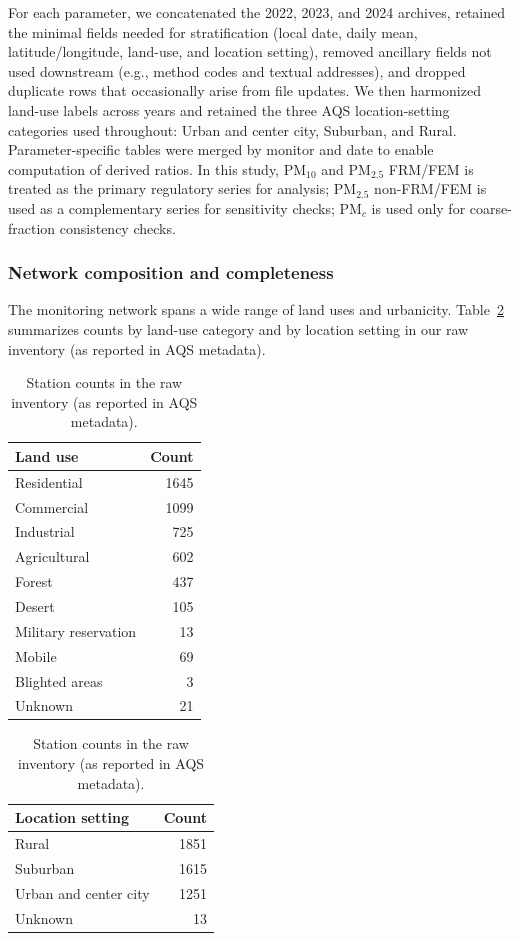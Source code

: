 \documentclass[a4paper,fleqn]{cas-sc}
\begin{document}
For each parameter, we concatenated the 2022, 2023, and 2024 archives, retained the minimal fields needed for stratification (local date, daily mean, latitude/longitude, land-use, and location setting), removed ancillary fields not used downstream (e.g., method codes and textual addresses), and dropped duplicate rows that occasionally arise from file updates. We then harmonized land-use labels across years and retained the three AQS location-setting categories used throughout: Urban and center city, Suburban, and Rural. Parameter-specific tables were merged by monitor and date to enable computation of derived ratios. In this study, PM$_{10}$ and PM$_{2.5}$ FRM/FEM is treated as the primary regulatory series for analysis; PM$_{2.5}$ non-FRM/FEM is used as a complementary series for sensitivity checks; PM$_{c}$ is used only for coarse-fraction consistency checks.

\subsubsection*{Network composition and completeness}

The monitoring network spans a wide range of land uses and urbanicity. Table~\ref{tab:stations_counts} summarizes counts by land-use category and by location setting in our raw inventory (as reported in AQS metadata).

\begin{table}[htb]
\centering
\caption{Station counts in the raw inventory (as reported in AQS metadata).}
\label{tab:stations_counts}
\begin{minipage}{0.48\linewidth}
\centering
\begin{tabular}{lr}
\hline
\textbf{Land use} & \textbf{Count} \\
\hline
Residential & 1645 \\
Commercial & 1099 \\
Industrial & 725 \\
Agricultural & 602 \\
Forest & 437 \\
Desert & 105 \\
Military reservation & 13 \\
Mobile & 69 \\
Blighted areas & 3 \\
Unknown & 21 \\
\hline
\end{tabular}
\end{minipage}\hfill
\begin{minipage}{0.48\linewidth}
\centering
\begin{tabular}{lr}
\hline
\textbf{Location setting} & \textbf{Count} \\
\hline
Rural & 1851 \\
Suburban & 1615 \\
Urban and center city & 1251 \\
Unknown & 13 \\
\hline
\end{tabular}
\end{minipage}
\end{table}
\end{document}
